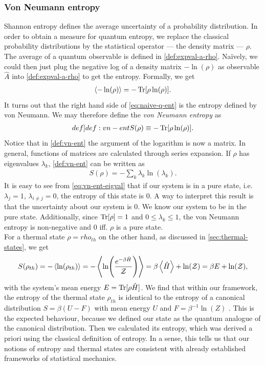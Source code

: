 \documentclass{book}
\numberwithin{equation}{section} %
\begin{document}
\subsubsection{Von Neumann entropy}
Shannon entropy defines the average uncertainty of a probability distribution.
In order to obtain a measure for quantum entropy, we replace the classical probability distributions by the statistical operator
--- the density matrix --- $\rho$.
The average of a quantum observable is defined in \cref{def:expval-a-rho}.
Na{\"i}vely, we could then just plug the negative log of a density matrix $-\ln(\rho)$ as observable $\hat{A}$
into \cref{def:expval-a-rho} to get the entropy.
Formally, we get
\begin{align}\label{eq:naive-q-ent}
    \expval{-\ln(\rho)} = -\Trace[\rho\ln(\rho)].
\end{align}
It turns out that the right hand side of \cref{eq:naive-q-ent} is the entropy defined by von Neumann.
We may therefore define the \emph{von Neumann entropy} as
\begin{align}\label[def]{def:vn-ent}
    S(\rho) \equiv -\Trace[\rho\ln(\rho)].
\end{align}
Notice that in \cref{def:vn-ent} the argument of the logarithm is now a matrix.
In general, functions of matrices are calculated through series expansion.
If $\rho$ has eigenvalues $\lambda_k$, \cref{def:vn-ent} can be written as
\begin{align}\label{eq:vn-ent-eigval}
    S(\rho) = - \sum\limits_k \lambda_k \ln(\lambda_k).
\end{align}
It is easy to see from \cref{eq:vn-ent-eigval} that if our system is in a pure state, i.e. $\lambda_j = 1$, $\lambda_{i\neq j} = 0$,
the entropy of this state is 0. A way to interpret this result is that the uncertainty about our system is 0. We know our system
to be in the pure state.
Additionally, since $\Tr[\rho]=1$ and $0 \leq \lambda_k \leq 1$, the von Neumann entropy is non-negative
and 0 iff. $\rho$ is a pure state.\\
For a thermal state $\rho = rho_{th}$ on the other hand, as discussed in \cref{sec:thermal-states}, we get
\begin{align}\label{eq:therm-ent}
    S(\rho_{th}) = - \expval{\ln(\rho_{th})}
    = - \expval{\ln(\frac{e^{-\beta\hat{H}}}{\mathcal{Z}})}
    = \beta\expval{\hat{H}} + \ln(\mathcal{Z}) = \beta E + \ln(\mathcal{Z}),
\end{align}
with the system's mean energy $E = \Trace[\rho \hat{H}]$.
We find that within our framework, the entropy of the thermal state $\rho_{th}$ is identical to the entropy of a
canonical distribution $S = \beta(U-F)$ with mean energy $U$ and $F=\beta^{-1}\ln(Z)$ \cite{HS_BA_SeifertSkript}.
This is the expected behaviour, because we defined our state as the quantum analogue of the canonical distribution.
Then we calculated its entropy, which was derived a priori using the classical definition of entropy.
In a sense, this tells us that our notions of entropy and thermal states are consistent with already established frameworks of statistical mechanics.
\end{document}
